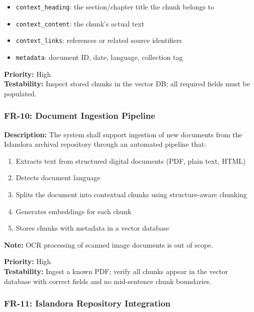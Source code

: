 \documentclass[
  11pt,
]{article}
\providecommand{\tightlist}{%
  \setlength{\itemsep}{0pt}\setlength{\parskip}{0pt}}
\begin{document}
\begin{itemize}
\tightlist
\item
  \texttt{context\_heading}: the section/chapter title the chunk belongs
  to
\item
  \texttt{context\_content}: the chunk's actual text
\item
  \texttt{context\_links}: references or related source identifiers
\item
  \texttt{metadata}: document ID, date, language, collection tag
\end{itemize}

\textbf{Priority:} High\\
\textbf{Testability:} Inspect stored chunks in the vector DB; all
required fields must be populated.

\subsubsection{FR-10: Document Ingestion
Pipeline}\label{fr-10-document-ingestion-pipeline}

\textbf{Description:} The system shall support ingestion of new
documents from the Islandora archival repository through an automated
pipeline that:

\begin{enumerate}
\def\labelenumi{\arabic{enumi}.}
\tightlist
\item
  Extracts text from structured digital documents (PDF, plain text,
  HTML)
\item
  Detects document language
\item
  Splits the document into contextual chunks using structure-aware
  chunking
\item
  Generates embeddings for each chunk
\item
  Stores chunks with metadata in a vector database
\end{enumerate}

\textbf{Note:} OCR processing of scanned image documents is out of
scope.

\textbf{Priority:} High\\
\textbf{Testability:} Ingest a known PDF; verify all chunks appear in
the vector database with correct fields and no mid-sentence chunk
boundaries.

\subsubsection{FR-11: Islandora Repository
Integration}\label{fr-11-islandora-repository-integration}
\end{document}
